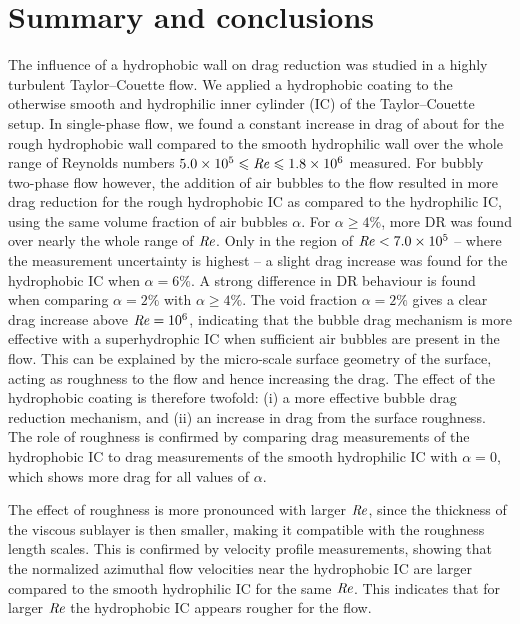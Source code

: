 
\section{Summary and conclusions}
The influence of a {hydrophobic} wall on drag reduction was studied in a highly turbulent Taylor--Couette flow. We applied a {hydrophobic} coating to the otherwise smooth and hydrophilic inner cylinder (IC) of the Taylor--Couette setup. In single-phase flow, we found a constant increase in drag of about  for the rough hydrophobic wall compared to the smooth hydrophilic wall over the whole range of Reynolds numbers $5.0\times 10^{5} \leqslant \mbox{\textit{Re}} \leqslant 1.8\times 10^{6}$ measured. For bubbly two-phase flow however, the addition of air bubbles to the flow resulted in more drag reduction for the rough hydrophobic IC as compared to the hydrophilic IC, using the same volume fraction of air bubbles $\alpha$. For $\alpha \geq 4\%$, more DR was found over nearly the whole range of $\mbox{\textit{Re}}$. Only in the region of $\mbox{\textit{Re}} < 7.0\times 10^{5}$ -- where the measurement uncertainty is highest -- a slight drag increase was found for the {hydrophobic} IC when $\alpha = 6\%$. A strong difference in DR behaviour is found when comparing $\alpha = 2\%$ with $\alpha \geq 4\%$. The void fraction $\alpha = 2\%$ gives a clear drag increase above $\mbox{\textit{Re}} = 10^6$, indicating that the bubble drag mechanism is more effective with a superhydrophic IC when sufficient air bubbles are present in the flow.
This can be explained by the micro-scale surface geometry of the surface, acting as roughness to the flow and hence increasing the drag. The effect of the {hydrophobic} coating is therefore twofold: (i) a more effective bubble drag reduction mechanism, and (ii) an increase in drag from the surface roughness. The role of roughness is confirmed by comparing drag measurements of the {hydrophobic} IC to drag measurements of the smooth hydrophilic IC with $\alpha = 0$, which shows more drag for all values of $\alpha$.

The effect of roughness is more pronounced with larger $\mbox{\textit{Re}}$, since the thickness of the viscous sublayer is then smaller, making it compatible with the roughness length scales. This is confirmed by velocity profile measurements, showing that the normalized azimuthal flow velocities near the {hydrophobic} IC are larger compared to the smooth hydrophilic IC for the same $\mbox{\textit{Re}}$. This indicates that for larger $\mbox{\textit{Re}}$ the {hydrophobic} IC appears rougher for the flow.

